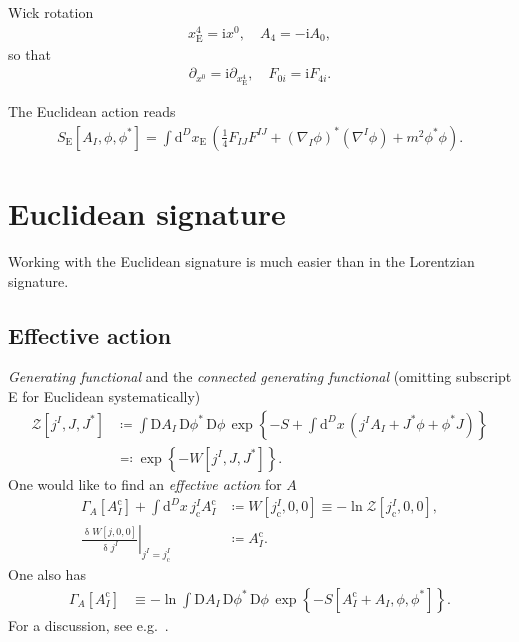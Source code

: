 \documentclass[12pt]{article}
\newcommand\mi{\mathrm{i}} %
\newcommand\dif{\mathrm{d}}
\newcommand\Dif{\mathrm{D}}
\newcommand\dva{\updelta}
\newcommand{\rbr}[1]{{\left(#1\right)}}
\newcommand{\fat}[2]{{\left.#1\right|_{#2}}}
\newcommand{\sfun}[2]{{#1}\mathopen{}\left[#2\right]\mathclose{}}
\newcommand{\cfun}[2]{{#1}\mathopen{}\left\{#2\right\}\mathclose{}}
\newcommand{\frdva}[2]{{\frac{\dva{#1}}{\dva{#2}}}}
\begin{document}
Wick rotation
\begin{align}
x_\text{E}^4 = \mi x^0,\quad A_4 = -\mi A_0,
\end{align}
so that
\begin{align}
\partial_{x^0} = \mi \partial_{x_\text{E}^4},\quad
F_{0i} = \mi F_{4i}.
\end{align}

The Euclidean action reads
\begin{align}
\sfun{S_\text{E}}{A_I,\phi,\phi^*} = \int \dif^{D} x_\text{E}\,\rbr{
	\frac{1}{4} F_{IJ} F^{IJ} + \rbr{\nabla_{\!I}\phi}^* \rbr{\nabla^I \phi} 
	+ m^2 \phi^* \phi}.
\end{align}


\section{Euclidean signature}
\label{sec:eucl}

Working with the Euclidean signature is much easier than in the Lorentzian 
signature.

\subsection{Effective action}
\label{ssec:eucl-effe}

\emph{Generating functional} and the \emph{connected generating functional} 
(omitting subscript E for Euclidean systematically)
\begin{align}
\sfun{\mathcal{Z}}{j^I, J, J^*} &\coloneqq
\int\Dif A_I\,\Dif\phi^*\,\Dif\phi\,
	\cfun{\exp}{-S+\int\dif^{D} x\,\rbr{j^I A_I + J^* \phi+\phi^* J}}
\\
&\eqqcolon \cfun{\exp}{-\sfun{W}{j^I, J, J^*}}.
\end{align}
One would like to find an \emph{effective action} for $A$
\begin{align}
\sfun{\varGamma_A}{A^\text{c}_I} + \int \dif^D x\,j_\text{c}^I A^\text{c}_I
&\coloneqq \sfun{W}{j_\text{c}^I, 0, 0}
\equiv -\ln \sfun{\mathcal{Z}}{j_\text{c}^I, 0, 0},
\label{eq:eucl-effe-100}
\\
\fat{\frdva{\sfun{W}{j, 0, 0}}{j^I}}{j^I = j_\text{c}^I}
	&\coloneqq A^\text{c}_I.
\end{align}
One also has
\begin{align}
\sfun{\varGamma_A}{A^\text{c}_I} &\equiv
-\ln \int \Dif A_I\,\Dif \phi^*\,\Dif \phi\,
	\cfun{\exp}{-\sfun{S}{A^\text{c}_I+A_I, \phi, \phi^*}}.
\end{align}
For a discussion, see e.g.\ \cite[ch.\ 34]{Schwartz2013}.
\end{document}
